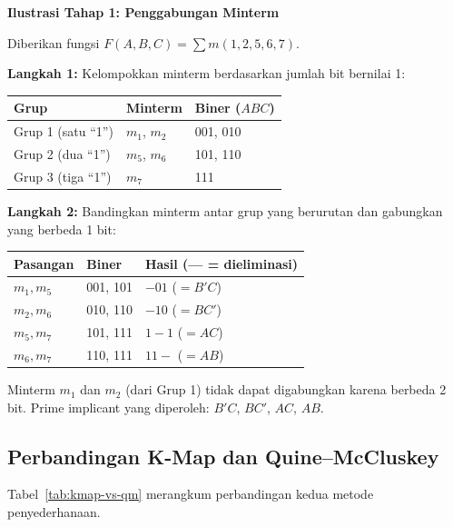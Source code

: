 \begin{contoh}
\textbf{Ilustrasi Tahap 1: Penggabungan Minterm}

Diberikan fungsi $F(A,B,C) = \sum m(1, 2, 5, 6, 7)$.

\textbf{Langkah 1:} Kelompokkan minterm berdasarkan jumlah bit bernilai 1:
\begin{center}
\begin{tabular}{|l|l|l|}
\hline
\textbf{Grup} & \textbf{Minterm} & \textbf{Biner ($ABC$)} \\ \hline
Grup 1 (satu ``1'') & $m_1$, $m_2$ & 001, 010 \\ \hline
Grup 2 (dua ``1'') & $m_5$, $m_6$ & 101, 110 \\ \hline
Grup 3 (tiga ``1'') & $m_7$ & 111 \\ \hline
\end{tabular}
\end{center}

\textbf{Langkah 2:} Bandingkan minterm antar grup yang berurutan dan gabungkan yang berbeda 1 bit:
\begin{center}
\begin{tabular}{|l|l|l|}
\hline
\textbf{Pasangan} & \textbf{Biner} & \textbf{Hasil (--- = dieliminasi)} \\ \hline
$m_1, m_5$ & 001, 101 & $-01$ ($= B'C$) \\ \hline
$m_2, m_6$ & 010, 110 & $-10$ ($= BC'$) \\ \hline
$m_5, m_7$ & 101, 111 & $1-1$ ($= AC$) \\ \hline
$m_6, m_7$ & 110, 111 & $11-$ ($= AB$) \\ \hline
\end{tabular}
\end{center}

Minterm $m_1$ dan $m_2$ (dari Grup 1) tidak dapat digabungkan karena berbeda 2 bit. Prime implicant yang diperoleh: $B'C$, $BC'$, $AC$, $AB$.
\end{contoh}

\subsection{Perbandingan K-Map dan Quine--McCluskey}

Tabel~\ref{tab:kmap-vs-qm} merangkum perbandingan kedua metode penyederhanaan.

